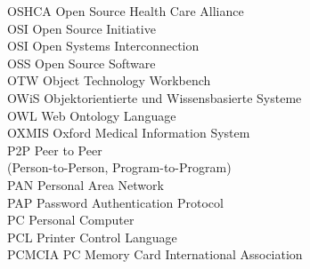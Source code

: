 \begin{tabbing}
    \>OSHCA \>\>Open Source Health Care Alliance\\

    \>OSI \>\>Open Source Initiative\\

    \>OSI \>\>Open Systems Interconnection\\


    \>OSS \>\>Open Source Software\\

    \>OTW \>\>Object Technology Workbench\\

    \>OWiS \>\>Objektorientierte und Wissensbasierte Systeme\\

    \>OWL \>\>Web Ontology Language\\

    \>OXMIS \>\>Oxford Medical Information System\\


    \>P2P \>\>Peer to Peer\\
        \>\>\>(Person-to-Person, Program-to-Program)\\




    \>PAN \>\>Personal Area Network\\

    \>PAP \>\>Password Authentication Protocol\\


    \>PC \>\>Personal Computer\\

    \>PCL \>\>Printer Control Language\\

    \>PCMCIA \>\>PC Memory Card International Association\\


\end{tabbing}
